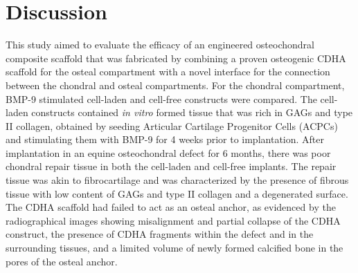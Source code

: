 \documentclass[twocolumn, serif, empirical, authordate, seplic]{jote-article}
\begin{document}
 {}\section*{Discussion} 

This study aimed to evaluate the efficacy of an engineered osteochondral composite scaffold that was fabricated by combining a proven osteogenic CDHA scaffold for the osteal compartment with a novel interface for the connection between the chondral and osteal compartments. For the chondral compartment, BMP-9 stimulated cell-laden and cell-free constructs were compared. The cell-laden constructs contained \emph{in vitro} formed tissue that was rich in GAGs and type II collagen, obtained by seeding Articular Cartilage Progenitor Cells (ACPCs) and stimulating them with BMP-9 for 4 weeks prior to implantation. After implantation in an equine osteochondral defect for 6 months, there was poor chondral repair tissue in both the cell-laden and cell-free implants. The repair tissue was akin to fibrocartilage and was characterized by the presence of fibrous tissue with low content of GAGs and type II collagen and a degenerated surface. The CDHA scaffold had failed to act as an osteal anchor, as evidenced by the radiographical images showing misalignment and partial collapse of the CDHA construct, the presence of CDHA fragments within the defect and in the surrounding tissues, and a limited volume of newly formed calcified bone in the pores of the osteal anchor.
\end{document}
